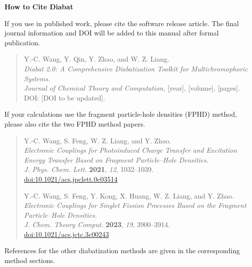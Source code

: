 \cleardoublepage
\thispagestyle{plain}
\begingroup
\small
{}
\setlength{\parindent}{0pt}
\setlength{\parskip}{0.75em}
\begin{center}
{\LARGE\bfseries How to Cite Diabat}\par
\end{center}
\vspace{0.6cm}
If you use \progname{} in published work, please cite the software release article. The final journal information and DOI will be added to this manual after formal publication.

\begin{quote}
Y.-C. Wang, Y. Qin, Y. Zhao, and W. Z. Liang.\\
\textit{Diabat 2.0: A Comprehensive Diabatization Toolkit for Multichromophoric Systems.}\\
\textit{Journal of Chemical Theory and Computation}, [year], [volume], [pages].\\
DOI: [DOI to be updated].
\end{quote}

If your calculations use the fragment particle-hole densities (FPHD) method, please also cite the two FPHD method papers.

\begin{quote}
Y.-C. Wang, S. Feng, W. Z. Liang, and Y. Zhao.\\
\textit{Electronic Couplings for Photoinduced Charge Transfer and Excitation Energy Transfer Based on Fragment Particle--Hole Densities.}\\
\textit{J. Phys. Chem. Lett.} \textbf{2021}, \textit{12}, 1032--1039.\\
\href{https://doi.org/10.1021/acs.jpclett.0c03514}{doi:10.1021/acs.jpclett.0c03514}

\vspace{0.45em}
Y.-C. Wang, S. Feng, Y. Kong, X. Huang, W. Z. Liang, and Y. Zhao.\\
\textit{Electronic Couplings for Singlet Fission Processes Based on the Fragment Particle--Hole Densities.}\\
\textit{J. Chem. Theory Comput.} \textbf{2023}, \textit{19}, 3900--3914.\\
\href{https://doi.org/10.1021/acs.jctc.3c00243}{doi:10.1021/acs.jctc.3c00243}
\end{quote}

References for the other diabatization methods are given in the corresponding method sections.
\par\endgroup\clearpage
